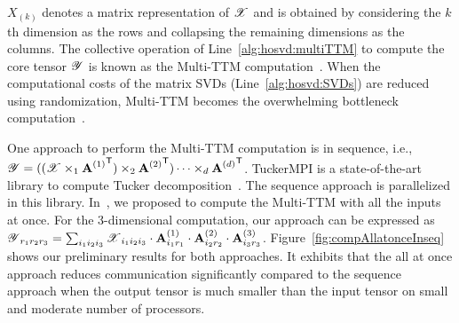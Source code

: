 \documentclass[a4paper,11pt]{article}
\newcommand{\X}{\T{X}}
\newcommand{\Y}{\T{Y}}
\begin{document}
	$X_{(k)}$ denotes a matrix representation of $\X$ and is obtained by considering the $k$th dimension as the rows and collapsing the remaining dimensions as the columns. The collective operation of Line~\ref{alg:hosvd:multiTTM} to compute the core tensor $\Y$ is known as the Multi-TTM computation~\cite{ABGKR-SIMAX-2024}. When the computational costs of the matrix SVDs (Line~\ref{alg:hosvd:SVDs}) are reduced using randomization, Multi-TTM becomes the overwhelming bottleneck computation~\cite{MSK-SIAM-2020,SGLTU-SIAM-2020,AAAMCPTO-ACCESS-2021}.
		
	
	One approach to perform the Multi-TTM computation is in sequence, i.e., $\Y = ((\X \times_1 {\Mn{A}{1}}^\Tra )\times_2 {\Mn{A}{2}}^\Tra)\cdots \times_d {\Mn{A}{d}}^\Tra$. TuckerMPI is a state-of-the-art library to compute Tucker decomposition~\cite{BKK-TOMS-2020}. The sequence approach is parallelized in this library. In~\cite{ABGKR-SIMAX-2024}, we proposed to compute the Multi-TTM with all the inputs at once. For the 3-dimensional computation, our approach can be expressed as $\Y_{r_1r_2r_3} = \sum_{i_1i_2i_3}\X_{i_1i_2i_3}\cdot\Mn{A}{1}_{i_1r_1}\cdot \Mn{A}{2}_{i_2r_2}\cdot \Mn{A}{3}_{i_3r_3}$. Figure~\ref{fig:compAllatonceInseq} shows our preliminary results for both approaches. It exhibits that the all at once approach reduces communication significantly compared to the sequence approach when the output tensor is much smaller than the input tensor on small and moderate number of processors. 
\end{document}
